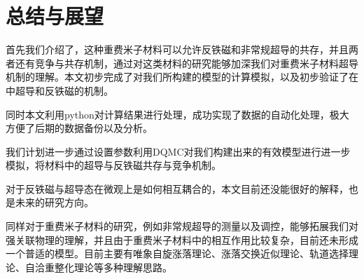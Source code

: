 
\section{总结与展望}

首先我们介绍了，这种重费米子材料可以允许反铁磁和非常规超导的共存，并且两者还有竞争与共存机制，通过对这类材料的研究能够加深我们对重费米子材料超导机制的理解。本文初步完成了对我们所构建的模型的计算模拟，以及初步验证了在中超导和反铁磁的机制。

同时本文利用python对计算结果进行处理，成功实现了数据的自动化处理，极大方便了后期的数据备份以及分析。


我们计划进一步通过设置参数利用DQMC对我们构建出来的有效模型进行进一步模拟，将材料中的超导与反铁磁共存与竞争机制。

对于反铁磁与超导态在微观上是如何相互耦合的，本文目前还没能很好的解释，也是未来的研究方向。

同样对于重费米子材料的研究，例如非常规超导的测量以及调控，能够拓展我们对强关联物理的理解，并且由于重费米子材料中的相互作用比较复杂，目前还未形成一个普适的模型。目前主要有唯象自旋涨落理论、涨落交换近似理论、轨道选择理论、自洽重整化理论等多种理解思路。
